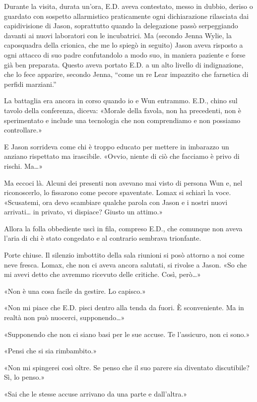Durante la visita, durata un'ora, E.D. aveva contestato, messo in
dubbio, deriso o guardato con sospetto allarmistico praticamente ogni
dichiarazione rilasciata dai capidivisione di Jason, soprattutto quando
la delegazione passò serpeggiando davanti ai nuovi laboratori con le
incubatrici. Ma (secondo Jenna Wylie, la caposquadra della crionica, che
me lo spiegò in seguito) Jason aveva risposto a ogni attacco di suo
padre confutandolo a modo suo, in maniera paziente e forse già ben
preparata. Questo aveva portato E.D. a un alto livello di indignazione,
che lo fece apparire, secondo Jenna, ``come un re Lear impazzito che
farnetica di perfidi marziani.''

La battaglia era ancora in corso quando io e Wun entrammo. E.D., chino
sul tavolo della conferenza, diceva: «Morale della favola, non ha
precedenti, non è sperimentato e include una tecnologia che non
comprendiamo e non possiamo controllare.»

E Jason sorrideva come chi è troppo educato per mettere in imbarazzo un
anziano rispettato ma irascibile. «Ovvio, niente di ciò che facciamo è
privo di rischi. Ma\ldots»

Ma eccoci là. Alcuni dei presenti non avevano mai visto di persona Wun
e, nel riconoscerlo, lo fissarono come pecore spaventate. Lomax si
schiarì la voce. «Scusatemi, ora devo scambiare qualche parola con Jason
e i nostri nuovi arrivati\ldots{} in privato, vi dispiace? Giusto un
attimo.»

Allora la folla obbediente uscì in fila, compreso E.D., che comunque non
aveva l'aria di chi è stato congedato e al contrario sembrava
trionfante.

Porte chiuse. Il silenzio imbottito della sala riunioni si posò attorno
a noi come neve fresca. Lomax, che non ci aveva ancora salutati, si
rivolse a Jason. «So che mi avevi detto che avremmo ricevuto delle
critiche. Così, però\ldots»

«Non è una cosa facile da gestire. Lo capisco.»

«Non mi piace che E.D. pisci dentro alla tenda da fuori. È sconveniente.
Ma in realtà non può nuocerci, supponendo\ldots»

«Supponendo che non ci siano basi per le sue accuse. Te l'assicuro, non
ci sono.»

«Pensi che si sia rimbambito.»

«Non mi spingerei così oltre. Se penso che il suo parere sia diventato
discutibile? Sì, lo penso.»

«Sai che le stesse accuse arrivano da una parte e dall'altra.»

